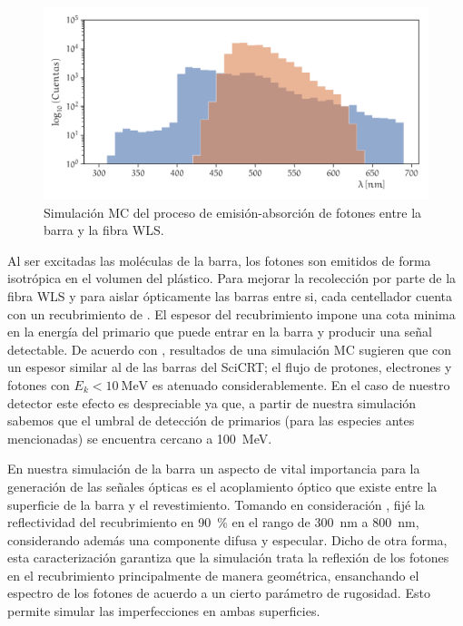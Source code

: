\begin{figure}
        \centering
        \includegraphics[width=\textwidth]{sim-optics-spect.pdf}
        \caption{Simulación MC del proceso de emisión-absorción de fotones entre la barra y la fibra WLS.}
        \label{fig:sim-optics}
\end{figure}

Al ser excitadas las moléculas de la barra, los fotones son emitidos de forma isotrópica en el volumen del plástico. Para mejorar la recolección por parte de la fibra WLS y para aislar ópticamente las barras entre si, cada centellador cuenta con un recubrimiento de . El espesor del recubrimiento impone una cota minima en la energía del primario que puede entrar en la barra y producir una señal detectable. De acuerdo con \cite{gros18}, resultados de una simulación MC sugieren que con un espesor similar al de las barras del SciCRT; el flujo de protones, electrones y fotones con $E_{k}<\SI{10}{\mega\electronvolt}$ es atenuado considerablemente. En el caso de nuestro detector este efecto es despreciable ya que, a partir de nuestra  simulación sabemos que el umbral de detección de primarios (para las especies antes mencionadas) se encuentra cercano a \SI{100}{\mega\electronvolt}.

En nuestra simulación de la barra un aspecto de vital importancia para la generación de las señales ópticas es el acoplamiento óptico que existe entre la superficie de la barra y el revestimiento. Tomando en consideración \cite{dietz16,gros18}, fijé la reflectividad del recubrimiento en \SI{90}{\percent} en el rango de \SI{300}{\nano\metre} a \SI{800}{\nano\metre}, considerando además una componente difusa y especular. Dicho de otra forma, esta caracterización garantiza que la simulación trata la reflexión de los fotones en el recubrimiento principalmente de manera geométrica, ensanchando el espectro de los fotones de acuerdo a un cierto parámetro de rugosidad. Esto permite simular las imperfecciones en ambas superficies.

